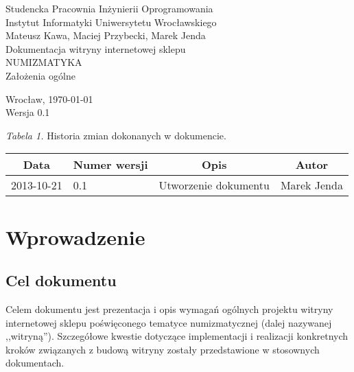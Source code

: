 \documentclass [11pt, a4paper, leqno]	{article}	%
\begin{document}

\begin{center}
	\thispagestyle{empty} 							%
	{\large Studencka Pracownia Inżynierii Oprogramowania} 		\\ [0.5cm]
	{\large Instytut Informatyki Uniwersytetu Wrocławskiego} 	\\ [6.0cm]

	{\large Mateusz Kawa, Maciej Przybecki, Marek Jenda} 		\\ [1.5cm]

	{\huge Dokumentacja witryny internetowej sklepu} 			\\ [0.5cm]
	{\huge NUMIZMATYKA} 										\\ [1.5cm]

	{\large Założenia ogólne} 									\\ [0.5cm]

	\vfill
	
	{\large Wrocław, \today}									\\ [0.5cm]
	{\large Wersja 0.1}
\end{center}

\newpage


\textit{Tabela 1.} Historia zmian dokonanych w dokumencie.

\begin{center}
	\begin{tabular}{| l | l | l | l |}
		\hline
		\multicolumn{1}{|c|}{Data} & 
		\multicolumn{1}{|c|}{Numer wersji} &  
		\multicolumn{1}{|c|}{Opis} &
		\multicolumn{1}{|c|}{Autor} \\ \hline \hline
		2013-10-21 & 0.1 & Utworzenie dokumentu & Marek Jenda \\ \hline
	\end{tabular}
\end{center}

\newpage


\tableofcontents

\newpage

\section{Wprowadzenie}

\subsection{Cel dokumentu}
\noindent
Celem  dokumentu jest prezentacja i opis wymagań ogólnych projektu witryny internetowej sklepu poświęconego tematyce numizmatycznej (dalej nazywanej ,,witryną'').
Szczegółowe kwestie dotyczące implementacji i realizacji konkretnych kroków związanych z budową witryny zostały przedstawione w stosownych dokumentach.
\end{document}
